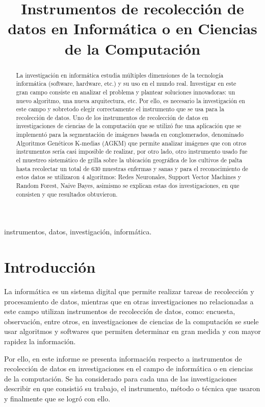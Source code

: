 \documentclass[10pt,journal]{IEEEtran}
\begin{document}
\title{Instrumentos de recolección de datos en Informática o en Ciencias de la Computación\\}
\author{
}
\maketitle
\begin{abstract}
La investigación en informática estudia múltiples dimensiones de la tecnología informática (software, hardware, etc.) y su uso en el mundo real. Investigar en este gran campo consiste en analizar el problema y plantear soluciones innovadoras: un nuevo algoritmo, una nueva arquitectura, etc. Por ello, es necesario la investigación en este campo y sobretodo elegir correctamente el instrumento que se usa para la recolección de datos.
Uno de los instrumentos de recolección de datos en investigaciones de ciencias de la computación que se utilizó fue una aplicación que se implementó para la segmentación de imágenes basada en conglomerados, denominado Algoritmos Genéticos K-medias (AGKM) que permite analizar imágenes que con otros instrumentos sería casi imposible de realizar, por otro lado, otro instrumento usado fue el muestreo sistemático de grilla sobre la ubicación geográfica de los cultivos de palta hasta recolectar un total de 630 muestras enfermas y sanas y para el reconocimiento de estos datos se utilizaron 4 algoritmos: Redes Neuronales, Support Vector Machines y Random Forest, Naive Bayes, asimismo se explican estas dos investigaciones, en que consisten y que resultados obtuvieron.
\end{abstract}

\begin{IEEEkeywords}
instrumentos, datos, investigación, informática.
\end{IEEEkeywords}

\section{\textbf{Introducción}}
La informática es un sistema digital que permite realizar tareas de recolección y procesamiento de datos, mientras que en otras investigaciones no relacionadas a este campo utilizan instrumentos de recolección de datos, como: encuesta, observación, entre otros, en investigaciones de ciencias de la computación se suele usar algoritmos y softwares que permiten determinar en gran medida y con mayor rapidez la información. \par
Por ello, en este informe se presenta información respecto a instrumentos de recolección de datos en investigaciones en el campo de informática o en ciencias de la computación. Se ha considerado para cada una de las investigaciones describir en que consistió su trabajo, el instrumento, método o técnica que usaron y finalmente que se logró con ello.
\end{document}

